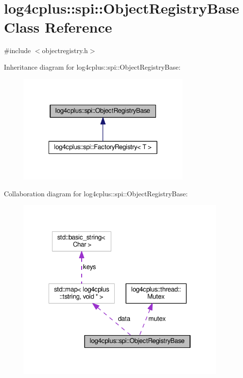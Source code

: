 \hypertarget{classlog4cplus_1_1spi_1_1ObjectRegistryBase}{\section{log4cplus\-:\-:spi\-:\-:Object\-Registry\-Base Class Reference}
\label{classlog4cplus_1_1spi_1_1ObjectRegistryBase}
}


{\ttfamily \#include $<$objectregistry.\-h$>$}



Inheritance diagram for log4cplus\-:\-:spi\-:\-:Object\-Registry\-Base\-:
\nopagebreak
\begin{figure}[H]
\begin{center}
\leavevmode
\includegraphics[width=246pt]{classlog4cplus_1_1spi_1_1ObjectRegistryBase__inherit__graph}
\end{center}
\end{figure}


Collaboration diagram for log4cplus\-:\-:spi\-:\-:Object\-Registry\-Base\-:
\nopagebreak
\begin{figure}[H]
\begin{center}
\leavevmode
\includegraphics[width=297pt]{classlog4cplus_1_1spi_1_1ObjectRegistryBase__coll__graph}
\end{center}
\end{figure}
